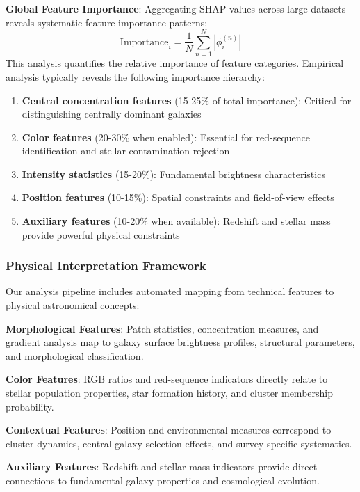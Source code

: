\documentclass[twocolumn,10pt]{aastex631}
\begin{document}
\textbf{Global Feature Importance}: Aggregating SHAP values across large datasets reveals systematic feature importance patterns:
\begin{equation}
\text{Importance}_i = \frac{1}{N} \sum_{n=1}^{N} |\phi_i^{(n)}|
\end{equation}
This analysis quantifies the relative importance of feature categories. Empirical analysis typically reveals the following importance hierarchy:
\begin{enumerate}
\item \textbf{Central concentration features} (15-25\% of total importance): Critical for distinguishing centrally dominant galaxies
\item \textbf{Color features} (20-30\% when enabled): Essential for red-sequence identification and stellar contamination rejection
\item \textbf{Intensity statistics} (15-20\%): Fundamental brightness characteristics
\item \textbf{Position features} (10-15\%): Spatial constraints and field-of-view effects
\item \textbf{Auxiliary features} (10-20\% when available): Redshift and stellar mass provide powerful physical constraints
\end{enumerate}

\subsubsection{Physical Interpretation Framework}

Our analysis pipeline includes automated mapping from technical features to physical astronomical concepts:

\textbf{Morphological Features}: Patch statistics, concentration measures, and gradient analysis map to galaxy surface brightness profiles, structural parameters, and morphological classification.

\textbf{Color Features}: RGB ratios and red-sequence indicators directly relate to stellar population properties, star formation history, and cluster membership probability.

\textbf{Contextual Features}: Position and environmental measures correspond to cluster dynamics, central galaxy selection effects, and survey-specific systematics.

\textbf{Auxiliary Features}: Redshift and stellar mass indicators provide direct connections to fundamental galaxy properties and cosmological evolution.
\end{document}
